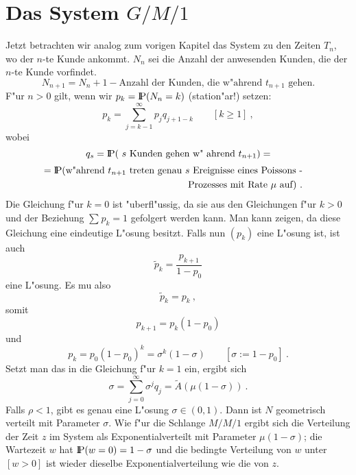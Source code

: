 \section{Das System $G/M/1$}
Jetzt betrachten wir analog zum vorigen Kapitel das System zu den Zeiten
$T_{n}$, wo der $n$-te Kunde ankommt. $N_{n}$ sei die Anzahl der
anwesenden Kunden, die der $n$-te Kunde vorfindet.
\begin{displaymath}
N_{n+1} = N_{n}+1-\mbox{Anzahl der Kunden, die w"ahrend $t_{n+1}$ gehen.}
\end{displaymath}
F"ur $n>0$ gilt, wenn wir $p_{k}= {\rm I\kern-0.2em P} (N_{n}=k)$ (station"ar!) setzen:
\begin{displaymath}
p_{k} = \sum_{j=k-1}^{\infty} p_{j} q_{j+1-k} \qquad [k \geq 1] ~,
\end{displaymath}
wobei
\begin{displaymath}
q_{s} = {\rm I\kern-0.2em P} (\mbox{ $s$ Kunden gehen w" ahrend
$t_{n+1}$)} = 
\end{displaymath}
\begin{eqnarray*}
= {\rm I\kern-0.2em P} (\mbox{w"ahrend $t_{n+1}$ treten genau $s$ Ereignisse eines Poissons 
-} \\
\mbox{Prozesses mit Rate $\mu$ auf)} ~. & & 
\end{eqnarray*} 
Die Gleichung f"ur $k=0$ ist "uberfl"ussig, da sie aus den Gleichungen
f"ur $k>0$ und der Beziehung $\sum_{}^{} p_{k}=1$ gefolgert werden kann.
Man kann zeigen, da\3 diese Gleichung eine eindeutige L"osung besitzt.
Falls nun $(p_{k})$ eine L"osung ist, ist auch 
\begin{displaymath}
\tilde p_{k} = \frac{p_{k+1}}{1-p_{0}}
\end{displaymath}
eine L"osung. Es mu\3 also
\begin{displaymath}
\tilde p_{k} = p_{k} ~,
\end{displaymath}
somit
\begin{displaymath}
p_{k+1} = p_{k}(1-p_{0}) 
\end{displaymath}
und
\begin{displaymath}
p_{k} = p_{0}(1-p_{0})^{k} = 
\sigma^{k}(1- \sigma) \qquad [ \sigma := 1 - p_{0}] ~.
\end{displaymath}  
Setzt man das in die Gleichung f"ur $k=1$ ein, ergibt sich
\begin{displaymath}
\sigma = \sum_{j=0}^{\infty} \sigma^{j} q_{j} = \tilde A (\mu(1-\sigma))
~.
\end{displaymath}
Falls $\rho < 1$, gibt es genau eine L"osung $\sigma \in (0,1)$. Dann ist
$N$ geometrisch verteilt mit Parameter $\sigma$. Wie f"ur die Schlange
$M/M/1$ ergibt sich die Verteilung der Zeit $z$ im System als
Exponentialverteilt mit Parameter $\mu(1- \sigma)$; die Wartezeit $w$ hat
${\rm I\kern-0.2em P} (w=0)= 1 - \sigma$ und die bedingte Verteilung von $w$ unter $[w>0]$
ist wieder dieselbe Exponentialverteilung wie die von $z$.
